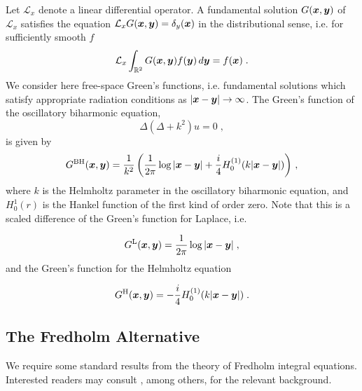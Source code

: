 Let $\mathcal{L}_x$ denote a linear differential operator. A fundamental
solution $G({\boldsymbol x},{\boldsymbol y})$ of $\mathcal{L}_x$ satisfies the equation
$\mathcal{L}_x G({\boldsymbol x},{\boldsymbol y}) = \delta_y({\boldsymbol x})$ in the distributional sense, i.e.
for sufficiently smooth $f$
\begin{equation}
  \mathcal{L}_x \int_{\mathbb{R}^2} G({\boldsymbol x},{\boldsymbol y}) f({\boldsymbol y}) \, d {\boldsymbol y} = f({\boldsymbol x}) \; .
  \nonumber
\end{equation}
We consider here
free-space Green's functions, i.e. fundamental solutions which satisfy appropriate
radiation conditions as $|{\boldsymbol x}-{\boldsymbol y}| \to \infty$.
The Green's function of the oscillatory biharmonic equation,
\begin{equation}
  \Delta ( \Delta + k^2 ) u = 0 \; , \label{eq:obiharm} \nonumber
\end{equation}
is given by 
\begin{equation}
  G^{\textrm{BH}}({\boldsymbol x},{\boldsymbol y}) = \frac{1}{k^2}
  \left (\frac{1}{2\pi} \log |{\boldsymbol x}-{\boldsymbol y}| +
  \frac{i}{4} H_0^{(1)}(k|{\boldsymbol x}-{\boldsymbol y}|) \right ) \, ,
  \label{eq:Gbh}
\end{equation}
where $k$ is the Helmholtz parameter in the oscillatory biharmonic equation,
and $H_{0}^{1}(r)$ is the Hankel function of the first kind of order zero.
Note that this is a scaled difference of the Green's function for
Laplace, i.e.

\begin{equation}
  G^{\textrm{L}}({\boldsymbol x},{\boldsymbol y}) = \frac{1}{2\pi} \log |{\boldsymbol x}-{\boldsymbol y}| \; , \nonumber
\end{equation}
and the Green's function for the Helmholtz equation

\begin{equation}
  G^{\textrm{H}}({\boldsymbol x},{\boldsymbol y}) = -\frac{i}{4} H_0^{(1)}(k|{\boldsymbol x}-{\boldsymbol y}|) \; . \nonumber
\end{equation}

\subsection{The Fredholm Alternative}

We require some standard results from the theory of
Fredholm integral equations. Interested readers may
consult \cite{reed1972methods,colton1983integral,kress1989linear},
among others, for the relevant background.

